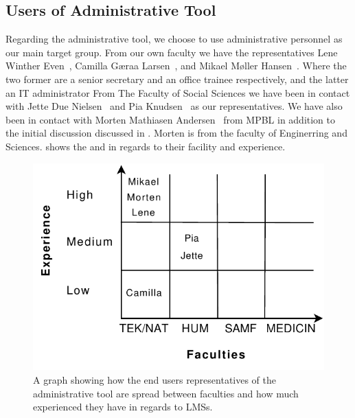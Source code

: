 
\subsection{Users of Administrative Tool}
\label{sub:enduserstool}
Regarding the administrative tool, we choose to use administrative personnel as our main target group.
From our own faculty we have the representatives Lene Winther Even~\cite{lene}, Camilla G\ae{}raa Larsen~\cite{camilla}, and Mikael M\o{}ller Hansen~\cite{mikael}.
Where the two former are a senior secretary and an office trainee respectively, and the latter an IT administrator
From The Faculty of Social Sciences we have been in contact with  Jette Due Nielsen~\cite{jette} and Pia Knudsen~\cite{piak} as our representatives.
We have also been in contact with Morten Mathiasen Andersen~\cite{morten} from MPBL in addition to the initial discussion discussed in .
Morten is from the faculty of Enginerring and Sciences.
 shows the \admpers{} and in regards to their facility and experience.  

\begin{figure}%
\center
\includegraphics[]{images/administratorsOfPG}%
\caption{A graph showing how the end users representatives of the administrative tool are spread between faculties and how much experienced they have in regards to LMSs.}%
\label{fig:adminPG}%
\end{figure}